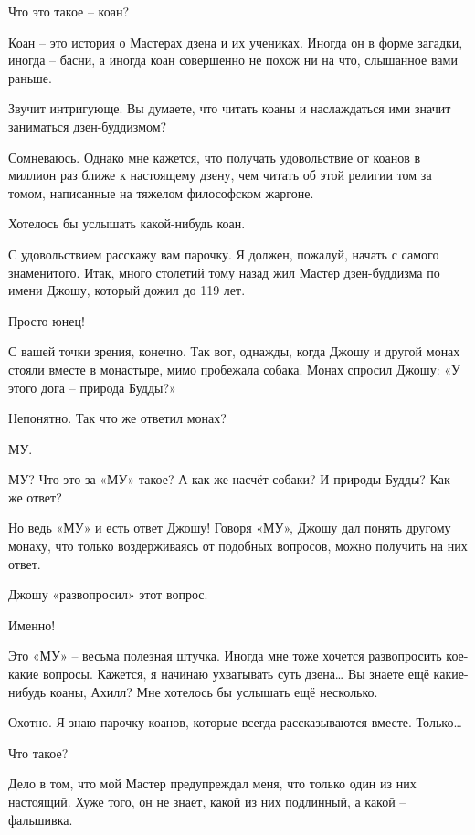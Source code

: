 \documentclass[../main.tex]{subfiles}
\begin{document}
\begin{dialogue}
 Что это такое \--- коан?

 Коан \--- это история о Мастерах дзена и их учениках. Иногда он в форме загадки, иногда \--- басни, а иногда коан совершенно не похож ни на что, слышанное вами раньше.

 Звучит интригующе. Вы думаете, что читать коаны и наслаждаться ими значит заниматься дзен-буддизмом?

 Сомневаюсь. Однако мне кажется, что получать удовольствие от коанов в миллион раз ближе к настоящему дзену, чем читать об этой религии том за томом, написанные на тяжелом философском жаргоне.

 Хотелось бы услышать какой-нибудь коан.

 С удовольствием расскажу вам парочку. Я должен, пожалуй, начать с самого знаменитого. Итак, много столетий тому назад жил Мастер дзен-буддизма по имени Джошу, который дожил до 119 лет.

 Просто юнец!

 С вашей точки зрения, конечно. Так вот, однажды, когда Джошу и другой монах стояли вместе в монастыре, мимо пробежала собака. Монах спросил Джошу: «У этого дога \--- природа Будды?»

 Непонятно. Так что же ответил монах?

 МУ.

 МУ? Что это за «МУ» такое? А как же насчёт собаки? И природы Будды? Как же ответ?

 Но ведь «МУ» и есть ответ Джошу! Говоря «МУ», Джошу дал понять другому монаху, что только воздерживаясь от подобных вопросов, можно получить на них ответ.

 Джошу «развопросил» этот вопрос.

 Именно!

 Это «МУ» \--- весьма полезная штучка. Иногда мне тоже хочется развопросить кое-какие вопросы. Кажется, я начинаю ухватывать суть дзена\ldots{} Вы знаете ещё какие-нибудь коаны, Ахилл? Мне хотелось бы услышать ещё несколько.

 Охотно. Я знаю парочку коанов, которые всегда рассказываются вместе. Только\ldots{}

 Что такое?

 Дело в том, что мой Мастер предупреждал меня, что только один из них настоящий. Хуже того, он не знает, какой из них подлинный, а какой \--- фальшивка.


\end{dialogue}
\end{document}
